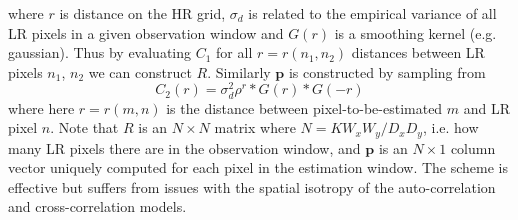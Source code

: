 where $r$ is distance on the HR grid, $\sigma_d$ is related to the empirical variance of all LR pixels in a given observation window and $G(r)$ is a smoothing kernel (e.g. gaussian).
%
Thus by evaluating $C_1$ for all $r = r(n_1, n_2)$ distances between LR pixels $n_1$, $n_2$ we can construct $R$.
%
Similarly $\bm{p}$ is constructed by sampling from
\begin{equation}
    C_2(r) = \sigma_d^2 \rho^{r} \ast G(r) \ast G(-r)
\end{equation}
where here $r = r(m, n)$ is the distance between pixel-to-be-estimated $m$ and LR pixel $n$.
%
Note that $R$ is an $N \times N$ matrix where $N = K W_x W_y/D_x D_y$, i.e. how many LR pixels there are in the observation window, and $\bm{p}$ is an $N \times 1$ column vector uniquely computed for each pixel in the estimation window.
%
The scheme is effective but suffers from issues with the spatial isotropy of the auto-correlation and cross-correlation models.

